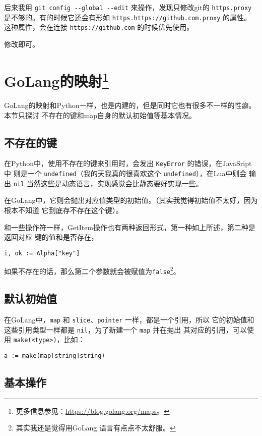 后来我用 \verb|git config --global --edit| 来操作，发现只修改git的 \verb|https.proxy|
是不够的。有的时候它还会有形如 \verb|https.https://github.com.proxy| 的属性。
这种属性，会在连接 {\tt https://github.com} 的时候优先使用。

修改即可。


\section[GoLang的映射]{GoLang的映射\footnote{更多信息参见：\url{https://blog.golang.org/maps}。}}

GoLang的映射和Python一样，也是内建的，但是同时它也有很多不一样的性癖。本节只探讨
不存在的键和map自身的默认初始值等基本情况。

\subsection{不存在的键}

在Python中，使用不存在的键来引用时，会发出 \verb|KeyError| 的错误，在JavaSript中
则是一个 \verb|undefined|（我的天我真的很喜欢这个 \verb|undefined|），在Lua中则会
输出 \verb|nil| 当然这些是动态语言，实现感觉会比静态要好实现一些。

在GoLang中，它则会抛出对应值类型的初始值。（其实我觉得初始值不太好，因为根本不知道
它到底存不存在这个键）。

和一些操作符一样，GetItem操作也有两种返回形式，第一种如上所述，第二种是返回对应
键的值和是否存在，
\begin{lstlisting}
i, ok := Alpha["key"]
\end{lstlisting}
如果不存在的话，那么第二个参数就会被赋值为\verb|false|\footnote{其实我还是觉得用GoLang
语言有点点不太舒服。}。

\subsection{默认初始值}

在GoLang中，\verb|map| 和 \verb|slice|、\verb|pointer| 一样，都是一个引用，所以
它的初始值和这些引用类型一样都是 \verb|nil|，为了新建一个 \verb|map| 并在抛出
其对应的引用，可以使用 \verb|make(<type>)|，比如：
\begin{lstlisting}
a := make(map[string]string)
\end{lstlisting}

\subsection{基本操作}

